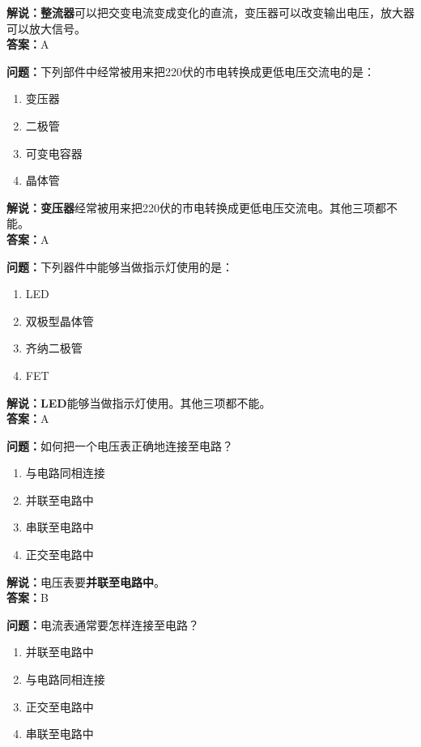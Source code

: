 \textbf{解说：整流器}可以把交变电流变成变化的直流，变压器可以改变输出电压，放大器可以放大信号。\\\textbf{答案：}A



\textbf{问题：}下列部件中经常被用来把220伏的市电转换成更低电压交流电的是：

\begin{enumerate}[label=\Alph*), leftmargin=1.5cm]
	\item 变压器
	\item 二极管
	\item 可变电容器
	\item 晶体管
\end{enumerate}

\textbf{解说：变压器}经常被用来把220伏的市电转换成更低电压交流电。其他三项都不能。\\\textbf{答案：}A


\textbf{问题：}下列器件中能够当做指示灯使用的是：

\begin{enumerate}[label=\Alph*), leftmargin=1.5cm]
	\item LED
	\item 双极型晶体管
	\item 齐纳二极管
	\item FET
\end{enumerate}

\textbf{解说：LED}能够当做指示灯使用。其他三项都不能。\\\textbf{答案：}A


\textbf{问题：}如何把一个电压表正确地连接至电路？

\begin{enumerate}[label=\Alph*), leftmargin=1.5cm]
	\item 与电路同相连接
	\item 并联至电路中
	\item 串联至电路中
	\item 正交至电路中
\end{enumerate}

\textbf{解说：}电压表要\textbf{并联至电路中}。\\\textbf{答案：}B


\textbf{问题：}电流表通常要怎样连接至电路？

\begin{enumerate}[label=\Alph*), leftmargin=1.5cm]
	\item 并联至电路中
	\item 与电路同相连接
	\item 正交至电路中
	\item 串联至电路中
\end{enumerate}

